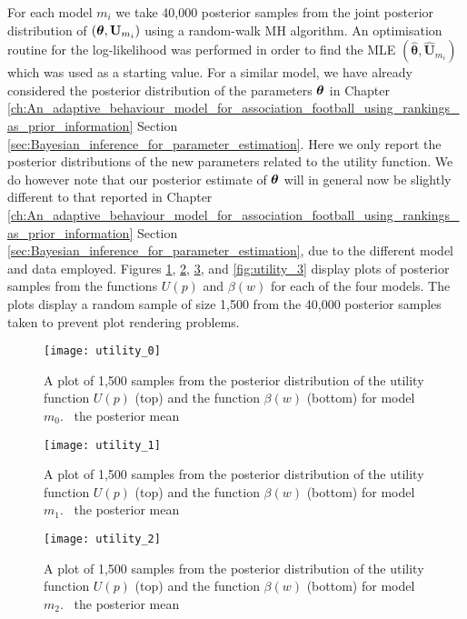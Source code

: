For each model \(m_i\) we take 40,000 posterior samples from the joint posterior distribution of \((\boldsymbol{\theta},
\mathbf{U}_{m_i})\) using a random-walk \gls{MH} algorithm. An optimisation routine for the log-likelihood was performed
in order to find the \gls{MLE} \((\boldsymbol{\hat{\theta}}, \mathbf{\hat{U}}_{m_i})\) which was used as a starting
value. For a similar model, we have already considered the posterior distribution of the parameters \(\boldsymbol{\theta}\) in
Chapter \ref{ch:An_adaptive_behaviour_model_for_association_football_using_rankings_as_prior_information} Section
\ref{sec:Bayesian_inference_for_parameter_estimation}. Here we only report the posterior distributions of the new
parameters related to the utility function. We do however note that our posterior estimate of \(\boldsymbol{\theta}\) will in
general now be slightly different to that reported in Chapter
\ref{ch:An_adaptive_behaviour_model_for_association_football_using_rankings_as_prior_information} Section
\ref{sec:Bayesian_inference_for_parameter_estimation}, due to the different model and data employed. Figures
\ref{fig:utility_0}, \ref{fig:utility_1}, \ref{fig:utility_2}, and \ref{fig:utility_3} display plots of posterior
samples from the functions \(U(p)\) and \(\beta(w)\) for each of the four models. The plots display a random sample of
size 1,500 from the 40,000 posterior samples taken to prevent plot rendering problems.
\begin{figure}[htp]
\begin{center} 
  \texttt{[image: utility\_0]}
  \caption{\label{fig:utility_0} A plot of 1,500 samples from the posterior distribution of the utility function
  \(U(p)\) (top) and the function \(\beta(w)\) (bottom) for model \(m_0\). \protect\redSolidLine\ the posterior mean}
\end{center}
\end{figure}
%
\begin{figure}[htp]
\begin{center}
  \texttt{[image: utility\_1]}
  \caption{\label{fig:utility_1} A plot of 1,500 samples from the posterior distribution of the utility function
  \(U(p)\) (top) and the function \(\beta(w)\) (bottom) for model \(m_1\). \protect\redSolidLine\ the posterior mean}
\end{center}
\end{figure}
%
\begin{figure}[htp]
\begin{center}
  \texttt{[image: utility\_2]}
  \caption{\label{fig:utility_2} A plot of 1,500 samples from the posterior distribution of the utility function
  \(U(p)\) (top) and the function \(\beta(w)\) (bottom) for model \(m_2\). \protect\redSolidLine\ the posterior mean}
\end{center}
\end{figure}
